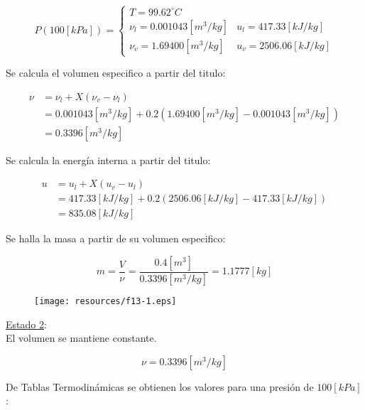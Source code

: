 \documentclass[letter,11pt]{article}
\begin{document}
\begin{enumerate}
\begin{equation*}
    P(100[kPa]) = \begin{cases}
        T = 99.62^\circ C \\
        \nu_l = 0.001043[m^3/kg] & u_l = 417.33[kJ/kg] \\
        \nu_v = 1.69400[m^3/kg]  & u_v = 2506.06[kJ/kg]
    \end{cases}
\end{equation*}

Se calcula el volumen especifico a partir del titulo:

\begin{equation*}
    \begin{split}
        \nu &= \nu_l + X(\nu_v - \nu_l) \\
            &= 0.001043[m^3/kg] + 0.2(1.69400[m^3/kg] - 0.001043[m^3/kg]) \\
            &= 0.3396[m^3/kg]
    \end{split}
\end{equation*}

Se calcula la energía interna a partir del titulo:

\begin{equation*}
    \begin{split}
        u &= u_l + X(u_v - u_l) \\
          &= 417.33[kJ/kg] + 0.2(2506.06[kJ/kg] - 417.33[kJ/kg]) \\
          &= 835.08[kJ/kg]
    \end{split}
\end{equation*}

Se halla la masa a partir de su volumen especifico:

\begin{equation*}
    m = \frac{V}{\nu} = \frac{0.4[m^3]}{0.3396[m^3/kg]} = 1.1777[kg]
\end{equation*}

\begin{figure}[H]
\centering
\texttt{[image: resources/f13-1.eps]}
\end{figure}

\underline{Estado 2}: \\
El volumen se mantiene constante.

\begin{equation*}
    \nu = 0.3396[m^3/kg]
\end{equation*}

De Tablas Termodinámicas se obtienen los valores para una presión de
$100[kPa]$:


\end{enumerate}
\end{document}
